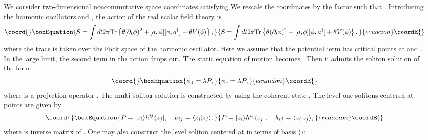 \documentclass[a4paper,12pt]{article}
\begin{document}
We consider two-dimensional noncommutative
space coordinates \coordHE{}  satisfying
\coordHE{}
We rescale the coordinates by the factor \myHighlight{$\sqrt{\theta}$}\coordHE{} such that
\coordHE{}.
Introducing the harmonic oscillators
\coordHE{} and
\coordHE{},
the action of the real scalar field theory is
\begin{equation}\coord{}\boxEquation{
 S=\int dt 2\pi {\rm Tr}\left\{ \theta (\partial_{t}\phi)^2
+[a,\phi] [\phi,a^{\dagger}]+\theta V(\phi)
\right\},
}{
 S=\int dt 2\pi {\rm Tr}\left\{ \theta (\partial_{t}\phi)^2
+[a,\phi] [\phi,a^{\dagger}]+\theta V(\phi)
\right\},
}{ecuacion}\coordE{}\end{equation}
where the trace is taken over the Fock space \coordHE{} of the harmonic
oscillator.
Here we assume that the potential term \coordHE{} has critical points
at \coordHE{} and \myHighlight{$\lambda$}\coordHE{}.
In the large \myHighlight{$\theta$}\coordHE{} limit, the second term in the action drops out.
The static equation of motion becomes \coordHE{}. Then
it admits the soliton solution of the form\cite{GMS}
\begin{equation}\coord{}\boxEquation{
 \phi_{0}=\lambda P,
\label{eq:sol0}
}{
 \phi_{0}=\lambda P,
}{ecuacion}\coordE{}\end{equation}
where \coordHE{} is a projection operator \coordHE{}.
The multi-soliton solution \cite{GHS} is constructed by using
the coherent state
\coordHE{}.
The \coordHE{} level one solitons centered at points \coordHE{} are
given by
\begin{equation}\coord{}\boxEquation{
P=|z_{i}\rangle h^{ij} \langle z_{j}|, \quad
h_{ij}=\langle z_{i} | z_{j} \rangle,
\label{eq:proj1}
}{
P=|z_{i}\rangle h^{ij} \langle z_{j}|, \quad
h_{ij}=\langle z_{i} | z_{j} \rangle,
}{ecuacion}\coordE{}\end{equation}
where \coordHE{} is inverse matrix of \coordHE{}.
One may also construct the level \coordHE{} soliton centered at \coordHE{} in terms of
basis
\coordHE{} (\coordHE{}):
\end{document}
